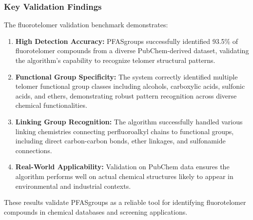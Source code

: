 \subsubsection*{Key Validation Findings}

The fluorotelomer validation benchmark demonstrates:

\begin{enumerate}
\item \textbf{High Detection Accuracy:} PFASgroups successfully identified 93.5\% of fluorotelomer compounds from a diverse PubChem-derived dataset, validating the algorithm's capability to recognize telomer structural patterns.

\item \textbf{Functional Group Specificity:} The system correctly identified multiple telomer functional group classes including alcohols, carboxylic acids, sulfonic acids, and ethers, demonstrating robust pattern recognition across diverse chemical functionalities.

\item \textbf{Linking Group Recognition:} The algorithm successfully handled various linking chemistries connecting perfluoroalkyl chains to functional groups, including direct carbon-carbon bonds, ether linkages, and sulfonamide connections.

\item \textbf{Real-World Applicability:} Validation on PubChem data ensures the algorithm performs well on actual chemical structures likely to appear in environmental and industrial contexts.
\end{enumerate}

These results validate PFASgroups as a reliable tool for identifying fluorotelomer compounds in chemical databases and screening applications.

